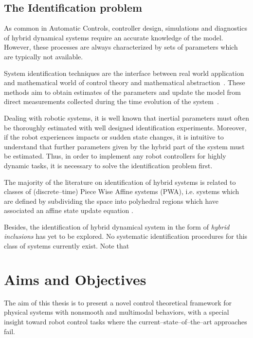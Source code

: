 \subsection{The Identification problem}
%
As common in Automatic Controls, controller design, simulations and diagnostics of hybrid dynamical systems require an accurate knowledge of the model. However, these {processes} are always characterized by sets of parameters which are typically not available.
%
\newline

%
System identification techniques are the interface between real world application and mathematical world of control theory and mathematical abstraction~\cite{LJUNG20101}. These methods aim to obtain estimates of the parameters and update the model from direct measurements collected during the time evolution of the system~\cite{SIS}.
%
\newline

%
Dealing with robotic systems, it is well known that inertial parameters must often be thoroughly estimated with well designed identification experiments. Moreover, if the robot experiences impacts or sudden state changes, it is intuitive to understand that further parameters given by the hybrid part of the system must be estimated. 
Thus, in order to implement any robot controllers for highly dynamic tasks, it is necessary to solve the identification problem first.
%
\newline

%
The majority of the literature on identification of hybrid systems is related to classes of (discrete--time) Piece Wise Affine systems (PWA), i.e. systems which are defined by subdividing the  space into polyhedral regions which have associated an affine state update equation \cite{Juloski,Paoletti,Bemporad,Ferrari, juloski2005bayesian}.
% 
\newline

%
Besides, the identification of hybrid dynamical system in the form of \textit{hybrid inclusions} has yet to be explored. No systematic identification procedures for this class of systems currently exist. Note that
%

\clearpage

\section{{Aims and Objectives}}
The aim of this thesis is to present a novel control theoretical framework for physical systems with nonsmooth and multimodal behaviors, with a special insight toward robot control tasks where the current--state--of--the--art approaches fail.

